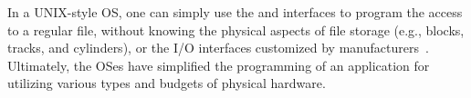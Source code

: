 In a UNIX-style OS,
one can simply use the  and  interfaces
to program the access to a regular file, without knowing the physical aspects of file storage (e.g., blocks, tracks, and cylinders),
or the I/O interfaces customized by manufacturers~\cite{ritchie78unix-retro}.
Ultimately, the OSes have simplified the programming of an application
for utilizing various types and budgets of physical hardware.



